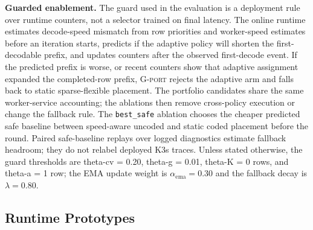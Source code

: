 \textbf{Guarded enablement.}
The guard used in the evaluation is a deployment rule over runtime counters,
not a selector trained on final latency.  The online runtime estimates
decode-speed mismatch from row priorities and worker-speed estimates before an
iteration starts, predicts if the adaptive policy will shorten the
first-decodable prefix, and updates counters after the observed first-decode
event.  If the predicted prefix is worse, or recent counters show that adaptive
assignment expanded the completed-row prefix, \textsc{G-port} rejects the
adaptive arm and falls back to static sparse-flexible placement.  The portfolio
candidates share the same worker-service accounting; the ablations then remove
cross-policy execution or change the fallback rule.  The \texttt{best\_safe}
ablation chooses the cheaper predicted safe baseline between speed-aware
uncoded and static coded placement before the round.  Paired safe-baseline
replays over logged diagnostics estimate fallback headroom; they do not relabel
deployed K3s traces.  Unless stated otherwise,
the guard thresholds are theta-cv = 0.20, theta-g = 0.01,
theta-K = 0 rows, and theta-a = 1 row; the EMA update weight is
$\alpha_{\mathrm{ema}}=0.30$ and the fallback decay is $\lambda=0.80$.

\subsection{Runtime Prototypes}

